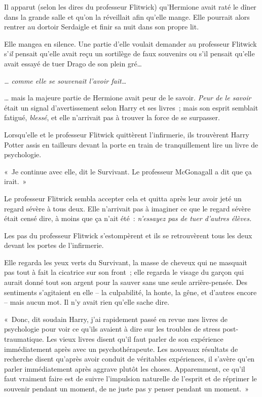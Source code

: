 Il apparut (selon les dires du professeur Flitwick) qu'Hermione avait raté le dîner dans la grande salle et qu'on la réveillait afin qu'elle mange.
Elle pourrait alors rentrer au dortoir Serdaigle et finir sa nuit dans son propre lit.

Elle mangea en silence.
Une partie d'elle voulait demander au professeur Flitwick s'\emph{il} pensait qu'elle avait reçu un sortilège de faux souvenirs ou s'il pensait qu'elle avait essayé de tuer Drago de son plein gré…

\emph{… comme elle se souvenait l'avoir fait…}

… mais la majeure partie de Hermione avait peur de le savoir.
\emph{Peur de le savoir} était un signal d'avertissement selon Harry et ses livres~; mais son esprit semblait fatigué, \emph{blessé}, et elle n'arrivait pas à trouver la force de se surpasser.

Lorsqu'elle et le professeur Flitwick quittèrent l'infirmerie, ils trouvèrent Harry Potter assis en tailleurs devant la porte en train de tranquillement lire un livre de psychologie.

«~Je continue avec elle, dit le Survivant.
Le professeur McGonagall a dit que ça irait.~»

Le professeur Flitwick sembla accepter cela et quitta après leur avoir jeté un regard sévère à tous deux.
Elle n'arrivait pas à imaginer ce que le regard sévère était censé dire, à moins que ça n'ait été~: \emph{n'essayez pas de tuer d'autres élèves.}

Les pas du professeur Flitwick s'estompèrent et ils se retrouvèrent tous les deux devant les portes de l'infirmerie.

Elle regarda les yeux verts du Survivant, la masse de cheveux qui ne masquait pas tout à fait la cicatrice sur son front~; elle regarda le visage du garçon qui aurait donné tout son argent pour la sauver sans une seule arrière-pensée.
Des sentiments s'agitaient en elle -- la culpabilité, la honte, la gêne, et d'autres encore -- mais aucun mot.
Il n'y avait rien qu'elle sache dire.

«~Donc, dit soudain Harry, j'ai rapidement passé en revue mes livres de psychologie pour voir ce qu'ils avaient à dire sur les troubles de stress post-traumatique.
Les vieux livres disent qu'il faut parler de son expérience immédiatement après avec un psychothérapeute.
Les nouveaux résultats de recherche disent qu'après avoir conduit de véritables expériences, il s'avère qu'en parler immédiatement après aggrave plutôt les choses.
Apparemment, ce qu'il faut vraiment faire est de suivre l'impulsion naturelle de l'esprit et de réprimer le souvenir pendant un moment, de ne juste pas y penser pendant un moment.~»

